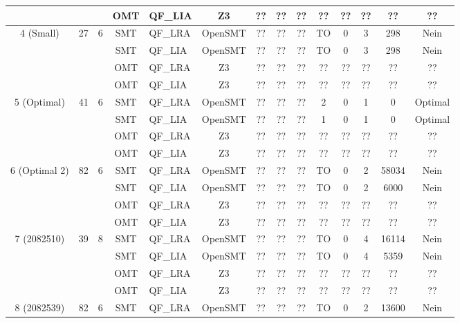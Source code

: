 \begin{landscape}
\begin{table}[H]
\begin{tabular}{|c|c|c|c|l|c|c|c|c|c|c|c|c|c|}
            & & & OMT & QF\_LIA & Z3 & ?? & ?? & ?? & ?? & ?? & ?? & ?? & ?? \\
            \hline
            \multirow{4}{*}{4 (Small)} & \multirow{4}{*}{27} & \multirow{4}{*}{6} & SMT & QF\_LRA & OpenSMT & ?? & ?? & ?? & TO & 0 & 3 & 298 & Nein \\
            & & & SMT & QF\_LIA & OpenSMT & ?? & ?? & ?? & TO & 0 & 3 & 298 & Nein \\
            & & & OMT & QF\_LRA & Z3 & ?? & ?? & ?? & ?? & ?? & ?? & ?? & ?? \\
            & & & OMT & QF\_LIA & Z3 & ?? & ?? & ?? & ?? & ?? & ?? & ?? & ?? \\
            \hline
            \multirow{4}{*}{5 (Optimal)} & \multirow{4}{*}{41} & \multirow{4}{*}{6} & SMT & QF\_LRA & OpenSMT & ?? & ?? & ?? & 2 & 0 & 1 & 0 & Optimal \\
            & & & SMT & QF\_LIA & OpenSMT & ?? & ?? & ?? & 1 & 0 & 1 & 0 & Optimal \\
            & & & OMT & QF\_LRA & Z3 & ?? & ?? & ?? & ?? & ?? & ?? & ?? & ?? \\
            & & & OMT & QF\_LIA & Z3 & ?? & ?? & ?? & ?? & ?? & ?? & ?? & ?? \\
            \hline
            \multirow{4}{*}{6 (Optimal 2)} & \multirow{4}{*}{82} & \multirow{4}{*}{6} & SMT & QF\_LRA & OpenSMT & ?? & ?? & ?? & TO & 0 & 2 & 58034 & Nein \\
            & & & SMT & QF\_LIA & OpenSMT & ?? & ?? & ?? & TO & 0 & 2 & 6000 & Nein \\
            & & & OMT & QF\_LRA & Z3 & ?? & ?? & ?? & ?? & ?? & ?? & ?? & ?? \\
            & & & OMT & QF\_LIA & Z3 & ?? & ?? & ?? & ?? & ?? & ?? & ?? & ?? \\
            \hline %
            \multirow{4}{*}{7 (2082510)} & \multirow{4}{*}{39} & \multirow{4}{*}{8} & SMT & QF\_LRA & OpenSMT & ?? & ?? & ?? & TO & 0 & 4 & 16114 & Nein \\
            & & & SMT & QF\_LIA & OpenSMT & ?? & ?? & ?? & TO & 0 & 4 & 5359 & Nein \\
            & & & OMT & QF\_LRA & Z3 & ?? & ?? & ?? & ?? & ?? & ?? & ?? & ?? \\
            & & & OMT & QF\_LIA & Z3 & ?? & ?? & ?? & ?? & ?? & ?? & ?? & ?? \\
            \hline %
            \multirow{4}{*}{8 (2082539)} & \multirow{4}{*}{82} & \multirow{4}{*}{6} & SMT & QF\_LRA & OpenSMT & ?? & ?? & ?? & TO & 0 & 2 & 13600 & Nein \\

\end{tabular}
\end{table}
\end{landscape}
